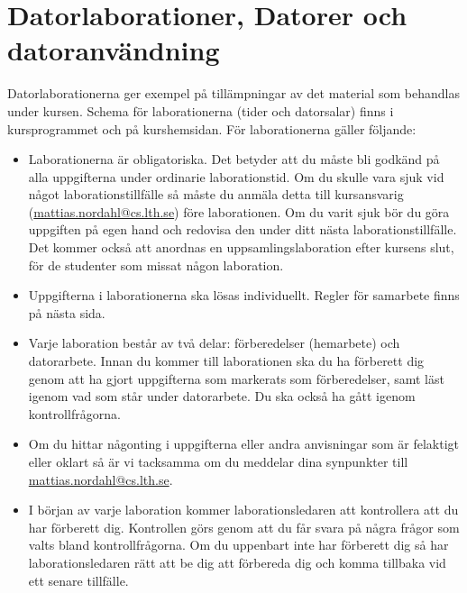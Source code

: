 \documentclass[fleqn, article, a4paper]{memoir}
\author{}
\begin{document}
\maketitle
\thispagestyle{titlepage}
\vspace{-4cm}
\section*{Datorlaborationer, Datorer och datoranvändning}

Datorlaborationerna ger exempel på tillämpningar av det material som behandlas under kursen. Schema för laborationerna (tider och datorsalar) finns i kursprogrammet och på kurshemsidan. För laborationerna gäller följande:

\begin{itemize}
	\item Laborationerna är obligatoriska. Det betyder att du måste bli godkänd på alla uppgifterna under ordinarie laborationstid. Om du skulle vara sjuk vid något laborationstillfälle så måste du anmäla detta till kursansvarig (\url{mattias.nordahl@cs.lth.se}) före laborationen. Om du varit sjuk bör du göra uppgiften på egen hand och redovisa den under ditt nästa laborationstillfälle. Det kommer också att anordnas en uppsamlingslaboration efter kursens slut, för de studenter som missat någon laboration.

	\item Uppgifterna i laborationerna ska lösas individuellt. Regler för samarbete finns på nästa sida.

	\item Varje laboration består av två delar: förberedelser (hemarbete) och datorarbete. Innan du kommer till laborationen ska du ha förberett dig genom att ha gjort uppgifterna som markerats som förberedelser, samt läst igenom vad som står under datorarbete. Du ska också ha gått igenom kontrollfrågorna.

	\item Om du hittar någonting i uppgifterna eller andra anvisningar som är felaktigt eller oklart så är vi tacksamma om du meddelar dina synpunkter till \url{mattias.nordahl@cs.lth.se}.


	\item I början av varje laboration kommer laborationsledaren att kontrollera att du har förberett dig. Kontrollen görs genom att du får svara på några frågor som valts bland kontrollfrågorna. Om du uppenbart inte har förberett dig så har laborationsledaren rätt att be dig att förbereda dig och komma tillbaka vid ett senare tillfälle.
	

\end{itemize}
\end{document}
